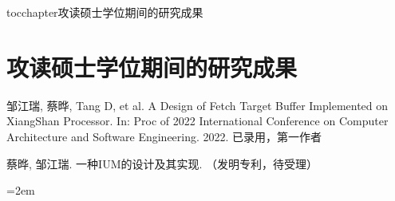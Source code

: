 
\newenvironment{thepublications}{\wuhao\song}

\addcontentsline{toc}{chapter}{攻读硕士学位期间的研究成果}%
\chapter*{\centering\xiaosan\hei\bfseries 攻读硕士学位期间的研究成果}

\begin{thepublications}

\setlength{\parindent}{0em}
\begin{publist}
	\item 邹江瑞, 蔡晔, Tang D, et al. A Design of Fetch Target Buffer Implemented on XiangShan Processor. In: Proc of 2022 International Conference on Computer Architecture and Software Engineering. 2022. 已录用，第一作者
	\item 蔡晔, 邹江瑞. 一种IUM的设计及其实现. （发明专利，待受理）
\end{publist}

\vfill
{}\hangindent=2em\noindent

\setlength{\parindent}{2em}

\end{thepublications}

